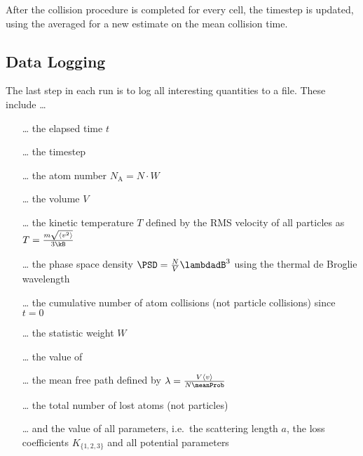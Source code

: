 After the collision procedure is completed for every cell, the timestep \Dt is updated, using the averaged \meanProb for a new estimate on the mean collision time.

\subsection{Data Logging}
The last step in each run is to log all interesting quantities to a file. These include \ldots 
\begin{itemize}
    \item[\ldots] the elapsed time $t$
    \item[\ldots] the timestep \Dt
    \item[\ldots] the atom number $N_\text{A} = N\cdot W$
    \item[\ldots] the volume $V$
    \item[\ldots] the kinetic temperature $T$ defined by the RMS velocity of all particles as $T = \frac{m\sqrt{\langle v^2\rangle}}{3\kB}$
    \item[\ldots] the phase space density $\PSD = \frac{N}{V}\lambdadB^3$ using the thermal de Broglie wavelength \lambdadB
    \item[\ldots] the cumulative number of atom collisions (not particle collisions) since $t=0$
    \item[\ldots] the statistic weight $W$
    \item[\ldots] the value of \maxProb
    \item[\ldots] the mean free path defined by $\lambda = \frac{V\langle v\rangle}{N\meanProb}$
    \item[\ldots] the total number of lost atoms (not particles)
    \item[\ldots] and the value of all parameters, i.e.\ the scattering length $a$, the loss coefficients $K_{\{1,2,3\}}$ and all potential parameters     
\end{itemize}
